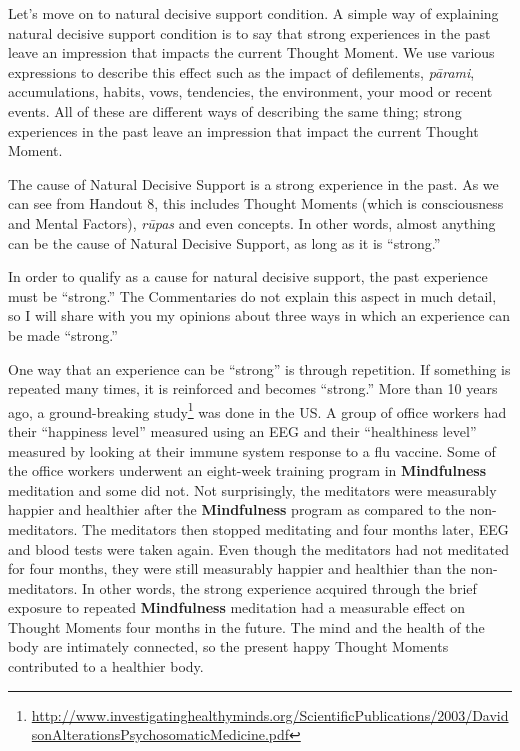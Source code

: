 Let’s move on to natural decisive support condition. A simple way of explaining natural decisive support condition is to say that strong experiences in the past leave an impression that impacts the current Thought Moment. We use various expressions to describe this effect such as the impact of defilements, \textit{pārami}, accumulations, habits, vows, tendencies, the environment, your mood or recent events. All of these are different ways of describing the same thing; strong experiences in the past leave an impression that impact the current Thought Moment.

The cause of Natural Decisive Support is a strong experience in the past. As we can see from Handout 8, this includes Thought Moments (which is consciousness and Mental Factors), \textit{rūpas} and even concepts. In other words, almost anything can be the cause of Natural Decisive Support, as long as it is “strong.”

In order to qualify as a cause for natural decisive support, the past experience must be “strong.” The Commentaries do not explain this aspect in much detail, so I will share with you my opinions about three ways in which an experience can be made “strong.”

One way that an experience can be “strong” is through repetition. If something is repeated many times, it is reinforced and becomes “strong.” More than 10 years ago, a ground-breaking study\footnote{\url{http://www.investigatinghealthyminds.org/ScientificPublications/2003/DavidsonAlterationsPsychosomaticMedicine.pdf}} was done in the US. A group of office workers had their “happiness level” measured using an EEG and their “healthiness level” measured by looking at their immune system response to a flu vaccine. Some of the office workers underwent an eight-week training program in \textbf{Mindfulness} meditation and some did not. Not surprisingly, the meditators were measurably happier and healthier after the \textbf{Mindfulness} program as compared to the non-meditators. The meditators then stopped meditating and four months later, EEG and blood tests were taken again. Even though the meditators had not meditated for four months, they were still measurably happier and healthier than the non-meditators. In other words, the strong experience acquired through the brief exposure to repeated \textbf{Mindfulness} meditation had a measurable effect on Thought Moments four months in the future. The mind and the health of the body are intimately connected, so the present happy Thought Moments contributed to a healthier body.

